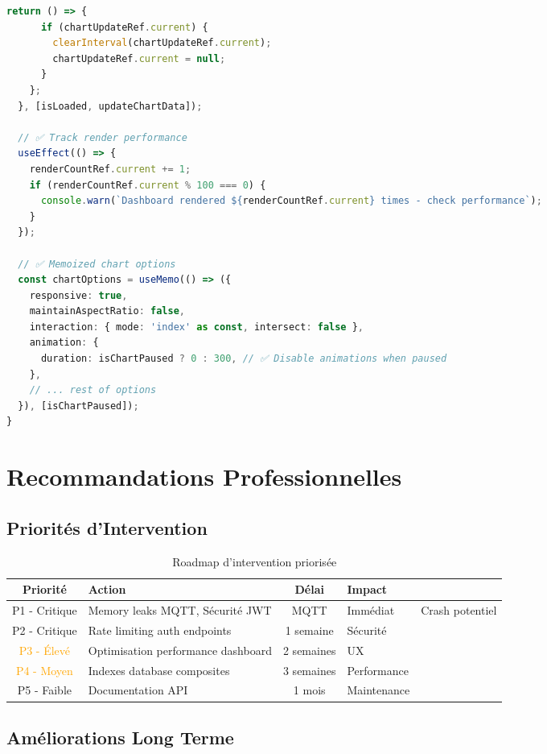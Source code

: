 \documentclass[a4paper,12pt]{article}
\begin{document}
\begin{lstlisting}[language=TypeScript, caption=Dashboard Optimisé avec Performance]
    return () => {
      if (chartUpdateRef.current) {
        clearInterval(chartUpdateRef.current);
        chartUpdateRef.current = null;
      }
    };
  }, [isLoaded, updateChartData]);

  // ✅ Track render performance
  useEffect(() => {
    renderCountRef.current += 1;
    if (renderCountRef.current % 100 === 0) {
      console.warn(`Dashboard rendered ${renderCountRef.current} times - check performance`);
    }
  });

  // ✅ Memoized chart options
  const chartOptions = useMemo(() => ({
    responsive: true,
    maintainAspectRatio: false,
    interaction: { mode: 'index' as const, intersect: false },
    animation: {
      duration: isChartPaused ? 0 : 300, // ✅ Disable animations when paused
    },
    // ... rest of options
  }), [isChartPaused]);
}
\end{lstlisting}

\section{Recommandations Professionnelles}

\subsection{Priorités d'Intervention}

\begin{table}[h]
\centering
\begin{tabular}{|c|p{6cm}|c|p{4cm}|}
\hline
\textbf{Priorité} & \textbf{Action} & \textbf{Délai} & \textbf{Impact} \\
\hline
\textcolor{alertred}{P1 - Critique} & Memory leaks MQTT, Sécurité JWT & MQTT & Immédiat & Crash potentiel \\
\hline
\textcolor{alertred}{P2 - Critique} & Rate limiting auth endpoints & 1 semaine & Sécurité \\
\hline
\textcolor{orange}{P3 - Élevé} & Optimisation performance dashboard & 2 semaines & UX \\
\hline
\textcolor{orange}{P4 - Moyen} & Indexes database composites & 3 semaines & Performance \\
\hline
\textcolor{accentgreen}{P5 - Faible} & Documentation API & 1 mois & Maintenance \\
\hline
\end{tabular}
\caption{Roadmap d'intervention priorisée}
\end{table}

\subsection{Améliorations Long Terme}
\end{document}
